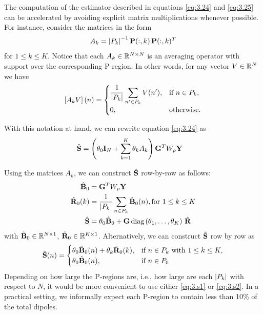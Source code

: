 The computation of the estimator described in equations \eqref{eq:3.24} and \eqref{eq:3.25} can be accelerated by avoiding explicit matrix multiplications whenever possible.
%
For instance, consider the matrices in the form 
\begin{equation}
    A_k = \left| {P_k} \right|^{-1} \mathbf{P}(:,k)\, \mathbf{P}(:,k)^T
\end{equation}
for $1\leq k \leq K$. 
%
Notice that each $A_k \in \mathbb{R}^{N\times N}$ is an averaging operator with support over the corresponding P-region.
%
In other words, for any vector $V\in \mathbb{R}^{N}$ we have
\begin{equation}
    \left[ A_k V \right](n) =
    \begin{cases}
        {\displaystyle \frac{1}{ \left| {P_k} \right| } \sum_{n'\in P_k} V(n')}, 
        &\text{if } n\in P_k, \\
        0, &\text{otherwise}.
    \end{cases}
\end{equation}

With this notation at hand, we can rewrite equation \eqref{eq:3.24} as
\begin{align}
    \hat{\mathbf{S}}
    &=
    \left( \theta_0 \mathbf{I}_N + \sum_{k=1}^K \theta_k A_k \right)\mathbf{G}^T W_\rho \mathbf{Y}
\end{align}


Using the matrices $A_k$, we can construct $\hat{\mathbf{S}}$ row-by-row as follows:
\begin{align}
    \hat{\mathbf{B}}_0
    &=
    \mathbf{G}^T W_\rho \mathbf{Y} \\
    \hat{\mathbf{R}}_0(k)
    &=
    {\displaystyle \frac{1}{\left| {P_k} \right|} \sum_{n\in P_k} \hat{\mathbf{B}}_0(n)},
    \text{for } 1\leq k \leq K
    \\
    \hat{\mathbf{S}}
    &=
    \theta_0 \hat{\mathbf{B}}_0 + \mathbf{G}\, \text{diag}\left( \theta_1, \dots, \theta_K \right)\, \hat{\mathbf{R}}
    \label{eq:3.s1}
\end{align}
with $\hat{\mathbf{B}}_0 \in \mathbb{R}^{N\times 1}$, $\hat{\mathbf{R}}_0 \in \mathbb{R}^{K\times 1}$.
%
Alternatively, we can construct $\hat{\mathbf{S}}$ row by row as
\begin{equation}
    \hat{\mathbf{S}}(n) =
    \begin{cases}
        \theta_0 \hat{\mathbf{B}}_0(n) + \theta_k \hat{\mathbf{R}}_0(k),
        &\text{if } n\in P_k \text{ with } 1\leq k \leq K,
        \\
        \theta_0 \hat{\mathbf{B}}_0(n), &\text{if } n\in P_0
    \end{cases}
    \label{eq:3.s2}
\end{equation}
Depending on how large the P-regions are, i.e., how large are each $\left| {P_k} \right|$ with respect to $N$, it would be more convenient to use
either \eqref{eq:3.s1} or \eqref{eq:3.s2}.
%
In a practical setting, we informally expect each P-region to contain less than 10\% of the total dipoles.

